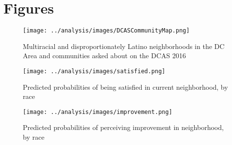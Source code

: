 \documentclass{baderart}
\begin{document}
















\clearpage
\section{Figures}

\begin{figure}[h!]
\caption{Multiracial and disproportionately Latino neighborhoods in the DC Area and communities asked about on the DCAS 2016}
\label{fig:map}
\centering
\texttt{[image: ../analysis/images/DCASCommunityMap.png]}
\end{figure}

\begin{sidewaysfigure}
\caption{Predicted probabilities of being satisfied in current neighborhood, by race}
\label{fig:satisfaction}
\centering
\texttt{[image: ../analysis/images/satisfied.png]}
\end{sidewaysfigure}

\begin{sidewaysfigure}
\caption{Predicted probabilities of perceiving improvement in neighborhood, by race}
\label{fig:improvement}
\centering
\texttt{[image: ../analysis/images/improvement.png]}
\end{sidewaysfigure}
\end{document}
